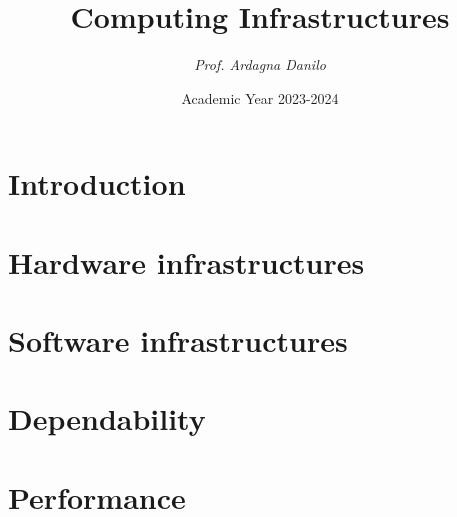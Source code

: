 \documentclass[12pt, a4paper]{report}
\title{\textbf{Computing Infrastructures}}
\author{\textit{Prof. Ardagna Danilo}}
\date{Academic Year 2023-2024}
\begin{document}
    \maketitle

    

    \cleardoublepage

    \tableofcontents

    \cleardoublepage

    \chapter{Introduction}
    
    

    \chapter{Hardware infrastructures}
    
    
    
    
    
    
    
    
    

    \chapter{Software infrastructures}
    
      
    
    

    \chapter{Dependability}
    
    
    
    

    \chapter{Performance}
    
    
    
    
\end{document}
